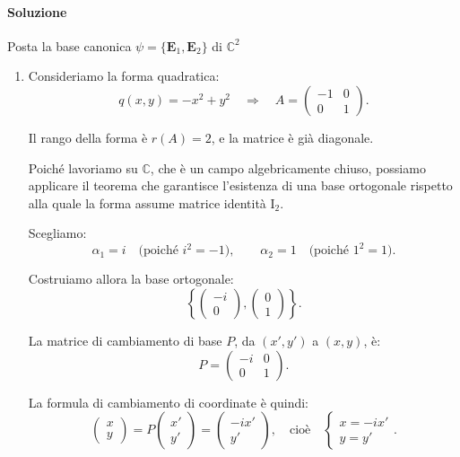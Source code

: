 \documentclass{article}
\theoremstyle{plain}
\theoremstyle{definition}
\theoremstyle{remark}
\begin{document}
\paragraph{Soluzione}
Posta la base canonica $\psi=\{\mathbf{E}_1,\mathbf{E}_2\}$ di $\mathbb{C}^2$
\begin{enumerate}
    \item Consideriamo la forma quadratica:
\[
q(x, y) = -x^2 + y^2 \quad \Rightarrow \quad A = 
\begin{pmatrix}
-1 & 0 \\
0 & 1
\end{pmatrix}.
\]

Il rango della forma è \(r(A) = 2\), e la matrice è già diagonale.

Poiché lavoriamo su \(\mathbb{C}\), che è un campo algebricamente chiuso, possiamo applicare il teorema che garantisce l'esistenza di una base ortogonale rispetto alla quale la forma assume matrice identità \(\mathrm{I}_2\).

Scegliamo:
\[
\alpha_1 = i \quad \text{(poiché \(i^2 = -1\))}, \qquad
\alpha_2 = 1 \quad \text{(poiché \(1^2 = 1\))}.
\]

Costruiamo allora la base ortogonale:
\[
\left\{
\begin{pmatrix}
-i \\
0
\end{pmatrix},
\begin{pmatrix}
0 \\
1
\end{pmatrix}
\right\}.
\]

La matrice di cambiamento di base \(P\), da \((x', y')\) a \((x, y)\), è:
\[
P = \begin{pmatrix}
-i & 0 \\
0 & 1
\end{pmatrix}.
\]

La formula di cambiamento di coordinate è quindi:
\[
\begin{pmatrix}
x \\
y
\end{pmatrix}
= P \begin{pmatrix}
x' \\
y'
\end{pmatrix}
=
\begin{pmatrix}
-i x' \\
y'
\end{pmatrix},
\quad \text{cioè} \quad
\begin{cases}
x = -i x' \\
y = y'
\end{cases}.
\]


\end{enumerate}
\end{document}
